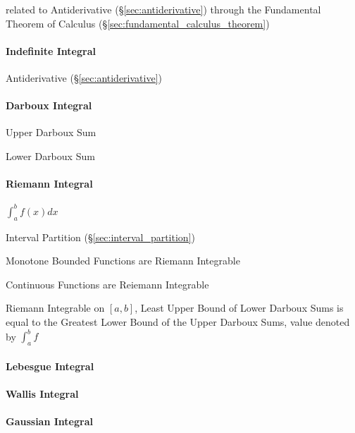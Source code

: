 \fist related to Antiderivative (\S\ref{sec:antiderivative}) through the
Fundamental Theorem of Calculus (\S\ref{sec:fundamental_calculus_theorem})



\paragraph{Indefinite Integral}\label{sec:indefinite_integral}\hfill

\fist Antiderivative (\S\ref{sec:antiderivative})



\paragraph{Darboux Integral}\label{sec:darboux_integral}\hfill

Upper Darboux Sum

Lower Darboux Sum



\paragraph{Riemann Integral}\label{sec:riemann_integral}\hfill

$\int_a^b f(x) dx$

Interval Partition (\S\ref{sec:interval_partition})

Monotone Bounded Functions are Riemann Integrable

Continuous Functions are Reiemann Integrable

Riemann Integrable on $[a,b]$, Least Upper Bound of Lower Darboux Sums
is equal to the Greatest Lower Bound of the Upper Darboux Sums, value
denoted by $\int_a^b f$



\paragraph{Lebesgue Integral}\label{sec:lebesgue_integral}\hfill

\paragraph{Wallis Integral}\label{sec:wallis_integral}\hfill

\paragraph{Gaussian Integral}\label{sec:gaussian_integral}\hfill

